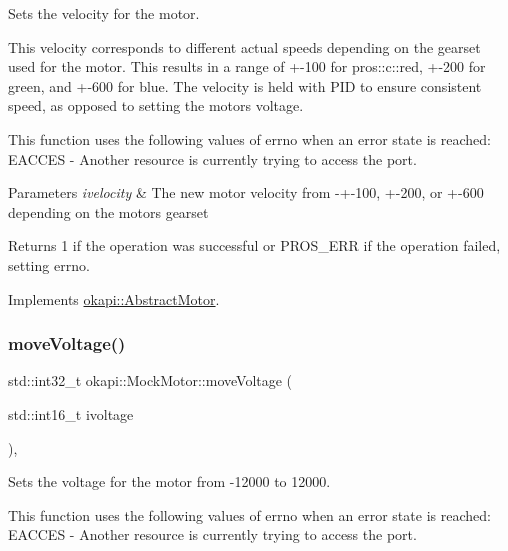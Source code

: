 Sets the velocity for the motor. 

This velocity corresponds to different actual speeds depending on the gearset used for the motor. This results in a range of +-\/100 for pros\+::c\+::red, +-\/200 for green, and +-\/600 for blue. The velocity is held with P\+ID to ensure consistent speed, as opposed to setting the motor\textquotesingle{}s voltage.

This function uses the following values of errno when an error state is reached\+: E\+A\+C\+C\+ES -\/ Another resource is currently trying to access the port.


\begin{DoxyParams}{Parameters}
{\em ivelocity} & The new motor velocity from -\/+-\/100, +-\/200, or +-\/600 depending on the motor\textquotesingle{}s gearset \\
\hline
\end{DoxyParams}
\begin{DoxyReturn}{Returns}
1 if the operation was successful or P\+R\+O\+S\+\_\+\+E\+RR if the operation failed, setting errno. 
\end{DoxyReturn}


Implements \mbox{\hyperlink{classokapi_1_1AbstractMotor_a3170268f8d06f728327dcda08505e02b}{okapi\+::\+Abstract\+Motor}}.

\mbox{\label{classokapi_1_1MockMotor_af511136af72163625fd166bc4bcb2270}} 
\subsubsection{\texorpdfstring{moveVoltage()}{moveVoltage()}}
{\footnotesize\ttfamily std\+::int32\+\_\+t okapi\+::\+Mock\+Motor\+::move\+Voltage (\begin{DoxyParamCaption}\item[{std\+::int16\+\_\+t}]{ivoltage }\end{DoxyParamCaption})\hspace{0.3cm}{\ttfamily [override]}, {\ttfamily [virtual]}}



Sets the voltage for the motor from -\/12000 to 12000. 

This function uses the following values of errno when an error state is reached\+: E\+A\+C\+C\+ES -\/ Another resource is currently trying to access the port.



